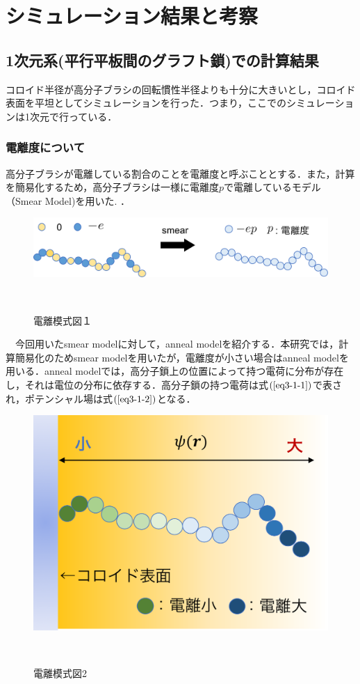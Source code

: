 \documentclass[10.5pt,a4j]{jarticle}
\begin{document}
\section{シミュレーション結果と考察}
\subsection{1次元系(平行平板間のグラフト鎖)での計算結果}
コロイド半径が高分子ブラシの回転慣性半径よりも十分に大きいとし，コロイド表面を平坦としてシミュレーションを行った．つまり，ここでのシミュレーションは1次元で行っている．
\vspace{-3mm}
\subsubsection{電離度について}
高分子ブラシが電離している割合のことを電離度と呼ぶこととする．また，計算を簡易化するため，高分子ブラシは一様に電離度$p$で電離しているモデル（Smear Model)を用いた. ．
%
\begin{figure}[H]
		\centering
            \includegraphics[keepaspectratio,scale=0.5]{Fig/Fig.5/smear.pdf}
            \caption{電離模式図１}
\            \label{Fig.3-1-1}
\end{figure}
%
　今回用いたsmear modelに対して，anneal modelを紹介する．本研究では，計算簡易化のためsmear modelを用いたが，電離度が小さい場合はanneal modelを用いる．anneal modelでは，高分子鎖上の位置によって持つ電荷に分布が存在し，それは電位の分布に依存する．高分子鎖の持つ電荷は式$(\ref{eq3-1-1})$で表され，ポテンシャル場は式$(\ref{eq3-1-2})$となる．
%
\begin{figure}[H]
		\centering
            \includegraphics[keepaspectratio,scale=0.4]{Fig/Fig.6/anneal.pdf}
            \caption{電離模式図2}
\            \label{Fig.3-1-2}
\end{figure}
\end{document}
